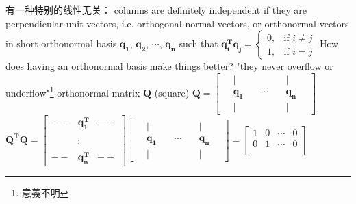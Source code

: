 \documentclass[12pt, a4paper]{article}
\begin{document}
{\noindent 有一种特别的线性无关：
columns are definitely independent if they are perpendicular unit vectors, i.e. orthogonal-normal vectors, or orthonormal vectors in short
\vspace{14pt}
\newline
orthonormal basis ${\mathbf{q_1}}$, ${\mathbf{q_2}}$, $\cdots$, ${\mathbf{q_n}}$ \quad such that \quad 
\begin{math}
	{\mathbf{q_i^T}}{\mathbf{q_j}} = 
	\begin{cases}
		0,  & \text{if $i \neq j$} \\
		1,  & \text{if $i = j$}
	\end{cases}
\end{math}
\vspace{14pt}
\newline
How does having an orthonormal basis make things better? "they never overflow or underflow"\footnote{{}意{}義{}不{}明{}}
\vspace{31pt}
\newline
orthonormal matrix ${\mathbf{Q}}$ (square)
\newline
\begin{math}
	{\mathbf{Q}} = 
	\begin{bmatrix}
		\ & | & \ & \ & \ & | & \ \\
		\ & {\mathbf{q_1}} & \ & \cdots & \ & {\mathbf{q_n}} & \ \\
		\ & | & \ & \ & \ & | & \ 
	\end{bmatrix}
\end{math}
\newline
\begin{math}
	{\mathbf{Q^{T}}}{\mathbf{Q}} = 
	\begin{bmatrix}
		-- & {\mathbf{q_1^T}} & -- \\
		\ & \ & \ \\
		\ & \vdots & \ \\
		\ & \ & \ \\
		-- & {\mathbf{q_n^T}} & -- 
	\end{bmatrix}
	\begin{bmatrix}
		\ & | & \ & \ & \ & | & \ \\
		\ & {\mathbf{q_1}} & \ & \cdots & \ & {\mathbf{q_n}} & \ \\
		\ & | & \ & \ & \ & | & \ 
	\end{bmatrix}
	 = 
	\begin{bmatrix}
		1 & 0 & \cdots & 0 \\
		0 & 1 & \cdots & 0 \\

\end{bmatrix}
\end{math}}
\end{document}
